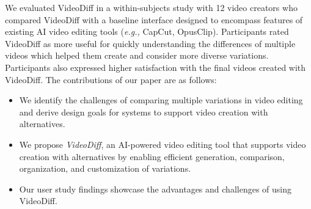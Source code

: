 


We evaluated VideoDiff in a within-subjects study with 12 video creators who compared VideoDiff with a baseline interface designed to encompass features of existing AI video editing tools (\textit{e.g.,} CapCut, OpusClip). Participants rated VideoDiff as more useful for quickly understanding the differences of multiple videos which helped them create and consider more diverse variations. Participants also expressed higher satisfaction with the final videos created with VideoDiff.
The contributions of our paper are as follows:
\begin{itemize}
    \item We identify the challenges of comparing multiple variations in video editing and derive design goals for systems to support video creation with alternatives.
    \item We propose \textit{VideoDiff}, an AI-powered video editing tool that supports video creation with alternatives by enabling efficient generation, comparison, organization, and customization of variations.
    \item Our user study findings showcase the advantages and challenges of using VideoDiff.
\end{itemize}


